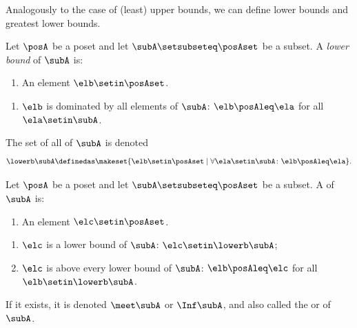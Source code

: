 Analogously to the case of (least) upper bounds, we can define lower bounds and greatest lower bounds.

\begin{ctdefinition}
    \label{def:greatest-lower-bound}
    \label{def:lower-bounds}
    Let $\posA$ be a poset and let $\subA \setsubseteq \posAset$ be a subset.
    A \emph{lower bound} of $\subA$ is:

    \constit
    \begin{enumerate}
        \item An element $\elb \setin \posAset$.
    \end{enumerate}

    \condit
    \begin{enumerate}
        \item $\elb$ is dominated by all elements of $\subA$: $\elb \posAleq \ela$ for all $\ela \setin \subA$.
    \end{enumerate}
    The set of all  of $\subA$ is denoted
    \begin{equation}
        \lowerb \subA\definedas \makeset{ \elb \setin \posAset \mid \forall \ela \setin \subA \colon \elb \posAleq \ela }.
    \end{equation}
\end{ctdefinition}

\begin{ctdefinition}\label{def:infimum}
    Let $\posA$ be a poset and let $\subA \setsubseteq \posAset$ be a subset.
    A  of $\subA$ is:

    \constit
    \begin{enumerate}
        \item An element $\elc \setin \posAset$.
    \end{enumerate}

    \condit
    \begin{enumerate}
        \item $\elc$ is a lower bound of $\subA$: $\elc \setin \lowerb \subA$;
        \item $\elc$ is above every lower bound of $\subA$: $\elb \posAleq \elc$ for all $\elb \setin \lowerb \subA$.
    \end{enumerate}
    If it exists, it is denoted $\meet \subA$ or $\Inf \subA$, and also called the  or  of $\subA$.
\end{ctdefinition}

